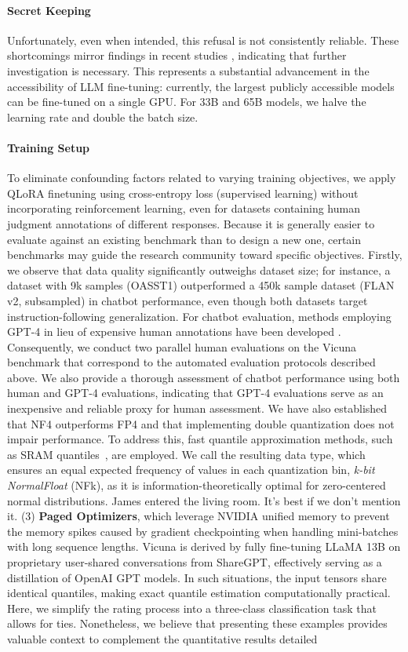 \paragraph{Secret Keeping} Unfortunately, even when intended, this refusal is not consistently reliable. These shortcomings mirror findings in recent studies \cite{sap2022neural}, indicating that further investigation is necessary. This represents a substantial advancement in the accessibility of LLM fine-tuning: currently, the largest publicly accessible models can be fine-tuned on a single GPU. For 33B and 65B models, we halve the learning rate and double the batch size. \paragraph{Training Setup} To eliminate confounding factors related to varying training objectives, we apply QLoRA finetuning using cross-entropy loss (supervised learning) without incorporating reinforcement learning, even for datasets containing human judgment annotations of different responses. Because it is generally easier to evaluate against an existing benchmark than to design a new one, certain benchmarks may guide the research community toward specific objectives. Firstly, we observe that data quality significantly outweighs dataset size; for instance, a dataset with 9k samples (OASST1) outperformed a 450k sample dataset (FLAN v2, subsampled) in chatbot performance, even though both datasets target instruction-following generalization. For chatbot evaluation, methods employing GPT-4 in lieu of expensive human annotations have been developed \citep{vicuna2023,peng2023instruction}. Consequently, we conduct two parallel human evaluations on the Vicuna benchmark that correspond to the automated evaluation protocols described above. We also provide a thorough assessment of chatbot performance using both human and GPT-4 evaluations, indicating that GPT-4 evaluations serve as an inexpensive and reliable proxy for human assessment. We have also established that NF4 outperforms FP4 and that implementing double quantization does not impair performance. To address this, fast quantile approximation methods, such as SRAM quantiles~\citep{dettmers2022optimizers}, are employed. We call the resulting data type, which ensures an equal expected frequency of values in each quantization bin, \emph{k-bit NormalFloat} (NFk), as it is information-theoretically optimal for zero-centered normal distributions. James entered the living room. It's best if we don't mention it. (3) \textbf{Paged Optimizers}, which leverage NVIDIA unified memory to prevent the memory spikes caused by gradient checkpointing when handling mini-batches with long sequence lengths. Vicuna is derived by fully fine-tuning LLaMA 13B on proprietary user-shared conversations from ShareGPT, effectively serving as a distillation of OpenAI GPT models. In such situations, the input tensors share identical quantiles, making exact quantile estimation computationally practical. Here, we simplify the rating process into a three-class classification task that allows for ties. Nonetheless, we believe that presenting these examples provides valuable context to complement the quantitative results detailed 
